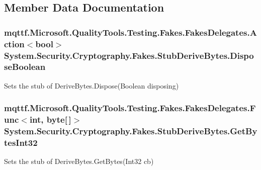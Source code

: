 \subsection{Member Data Documentation}
\hypertarget{class_system_1_1_security_1_1_cryptography_1_1_fakes_1_1_stub_derive_bytes_ac18d6dc91b6c3022c79e767384108bb7}{
\subsubsection[{Dispose\-Boolean}]{\setlength{\rightskip}{0pt plus 5cm}mqttf.\-Microsoft.\-Quality\-Tools.\-Testing.\-Fakes.\-Fakes\-Delegates.\-Action$<$bool$>$ System.\-Security.\-Cryptography.\-Fakes.\-Stub\-Derive\-Bytes.\-Dispose\-Boolean}}\label{class_system_1_1_security_1_1_cryptography_1_1_fakes_1_1_stub_derive_bytes_ac18d6dc91b6c3022c79e767384108bb7}


Sets the stub of Derive\-Bytes.\-Dispose(\-Boolean disposing)

\hypertarget{class_system_1_1_security_1_1_cryptography_1_1_fakes_1_1_stub_derive_bytes_ae95065d14b30024ee5e715be6afa4da2}{
\subsubsection[{Get\-Bytes\-Int32}]{\setlength{\rightskip}{0pt plus 5cm}mqttf.\-Microsoft.\-Quality\-Tools.\-Testing.\-Fakes.\-Fakes\-Delegates.\-Func$<$int, byte\mbox{[}$\,$\mbox{]}$>$ System.\-Security.\-Cryptography.\-Fakes.\-Stub\-Derive\-Bytes.\-Get\-Bytes\-Int32}}\label{class_system_1_1_security_1_1_cryptography_1_1_fakes_1_1_stub_derive_bytes_ae95065d14b30024ee5e715be6afa4da2}


Sets the stub of Derive\-Bytes.\-Get\-Bytes(\-Int32 cb)

